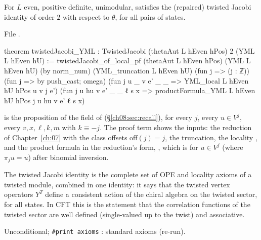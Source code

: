\begin{theorem}\label{ch08:thm:jacobi}
For $L$ even, positive definite, unimodular,  satisfies the (repaired) twisted Jacobi
identity of order $2$ with respect to $\theta$, for all pairs of states.
\end{theorem}
\noindent File .
\begin{leancode}
theorem twistedJacobi_YML : TwistedJacobi (thetaAut L hEven hPos) 2 (YML L hEven hU) :=
  twistedJacobi_of_local_pf (thetaAut L hEven hPos) (YML L hEven hU) (by norm_num)
    (YML_truncation L hEven hU) (fun j => (j : ℤ)) (fun j => by push_cast; omega)
    (fun j u _ v e' _ _ => YML_local L hEven hU hPos u v j e')
    (fun j u hu v e' _ _ ℓ s x => productFormula_YML L hEven hU hPos j u hu v e' ℓ s x)
\end{leancode}
\begin{dictionary}
 is the proposition of the  field of 
(\S\ref{ch08:sec:recall}), for every $j$, every $u\in V^j$, every $v,x,\ell,k,m$ with
$k\equiv -j$.  The proof term shows the inputs: the reduction of Chapter~\ref{ch:07} with the
class offsets $\mathrm{off}(j)=j$, the truncation, the locality , and the product
formula in the reduction's form, , which is  for
$u\in V^j$ (where $\pi_ju=u$) after binomial inversion.
\end{dictionary}

\begin{physics}
The twisted Jacobi identity is the complete set of OPE and locality axioms of a twisted module, combined in one identity: it says that the twisted vertex operators $Y^T$ define a consistent action of the chiral algebra on the twisted sector, for all states. In CFT this is the statement that the correlation functions of the twisted sector are well defined (single-valued up to the twist) and associative.
\end{physics}
\begin{status}
Unconditional; \texttt{\#print axioms} : standard axioms (re-run).
\end{status}

